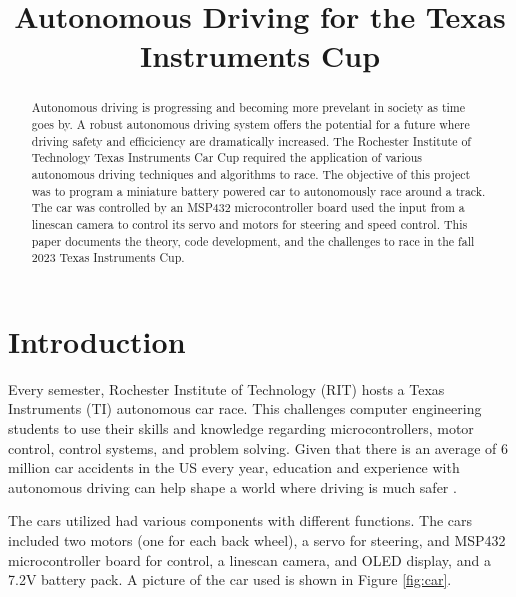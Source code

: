 \documentclass[conference]{IEEEtran}
\begin{document}
\title{Autonomous Driving for the Texas Instruments Cup}

\author{
\and
{}
}

\maketitle

\begin{abstract}
Autonomous driving is progressing and becoming more prevelant in society as time goes by. A robust autonomous driving system offers the potential for a future where driving safety and efficiciency are dramatically increased. The Rochester Institute of Technology Texas Instruments Car Cup required the application of various autonomous driving techniques and algorithms to race. The objective of this project was to program a miniature battery powered car to autonomously race around a track. The car was controlled by an MSP432 microcontroller board used the input from a linescan camera to control its servo and motors for steering and speed control. This paper documents the theory, code development, and the challenges to race in the fall 2023 Texas Instruments Cup.
\end{abstract}

\section{Introduction}
Every semester, Rochester Institute of Technology (RIT) hosts a Texas Instruments (TI) autonomous car race. This challenges computer engineering students to use their skills and knowledge regarding microcontrollers, motor control, control systems, and problem solving. Given that there is an average of 6 million car accidents in the US every year, education and experience with autonomous driving can help shape a world where driving is much safer \cite{b1}.

The cars utilized had various components with different functions. The cars included two motors (one for each back wheel), a servo for steering, and MSP432 microcontroller board for control, a linescan camera, and OLED display, and a 7.2V battery pack. A picture of the car used is shown in Figure \ref{fig:car}.
\end{document}
